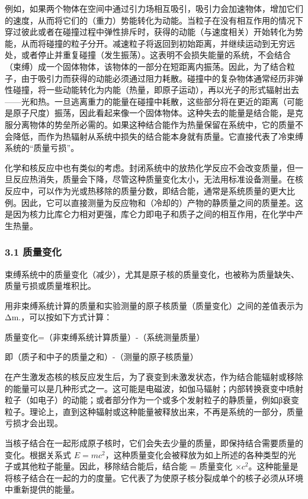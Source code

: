 例如，如果两个物体在空间中通过引力场相互吸引，吸引力会加速物体，增加它们的速度，从而将它们的（重力）势能转化为动能。当粒子在没有相互作用的情况下穿过彼此或者在碰撞过程中弹性排斥时，获得的动能（与速度相关）开始转化为势能，从而将碰撞的粒子分开。减速粒子将返回到初始距离，并继续运动到无穷远处，或者停止并重复碰撞（发生振荡）。这表明不会损失能量的系统，不会结合（束缚）成一个固体物体，该物体的一部分在短距离内振荡。因此，为了结合粒子，由于吸引力而获得的动能必须通过阻力耗散。碰撞中的复杂物体通常经历非弹性碰撞，将一些动能转化为内能（热量，即原子运动），再以光子的形式辐射出去——光和热。一旦逃离重力的能量在碰撞中耗散，这些部分将在更近的距离（可能是原子尺度）振荡，因此看起来像一个固体物体。这种失去的能量是结合能，是克服分离物体的势垒所必需的。如果这种结合能作为热量保留在系统中，它的质量不会降低，而作为热辐射从系统中损失的结合能本身就有质量。它直接代表了冷束缚系统的“质量亏损”。

化学和核反应中也有类似的考虑。封闭系统中的放热化学反应不会改变质量，但一旦反应热消失，质量会下降，尽管这种质量变化太小，无法用标准设备测量。在核反应中，可以作为光或热移除的质量分数，即结合能，通常是系统质量的更大比例。因此，它可以直接测量为反应物和（冷却的）产物的静质量之间的质量差。这是因为核力比库仑力相对更强，库仑力即电子和质子之间的相互作用，在化学中产生热量。

\subsubsection{3.1 质量变化}
束缚系统中的质量变化（减少），尤其是原子核的质量变化，也被称为质量缺失、质量亏损或质量堆积比。

用非束缚系统计算的质量和实验测量的原子核质量（质量变化）之间的差值表示为Δm.，可以按如下方式计算：

质量变化=（非束缚系统计算质量）-（系统测量质量）

即（质子和中子的质量之和）-（测量的原子核质量）

在产生激发态核的核反应发生后，为了衰变到未激发状态，作为结合能辐射或移除的能量可以是几种形式之一。这可能是电磁波，如伽马辐射；内部转换衰变中喷射粒子（如电子）的动能；或者部分作为一个或多个发射粒子的静质量，例如β衰变粒子。理论上，直到这种辐射或这种能量被释放出来，不再是系统的一部分，质量亏损才会出现。

当核子结合在一起形成原子核时，它们会失去少量的质量，即保持结合需要质量的变化。根据关系式 $E = mc^2$，这种质量变化会被释放为如上所述的各种类型的光子或其他粒子能量。因此，移除结合能后，结合能 = 质量变化 $\times c^2$。这种能量是将核子结合在一起的力的度量。它代表了为使原子核分裂成单个的核子必须从环境中重新提供的能量。

